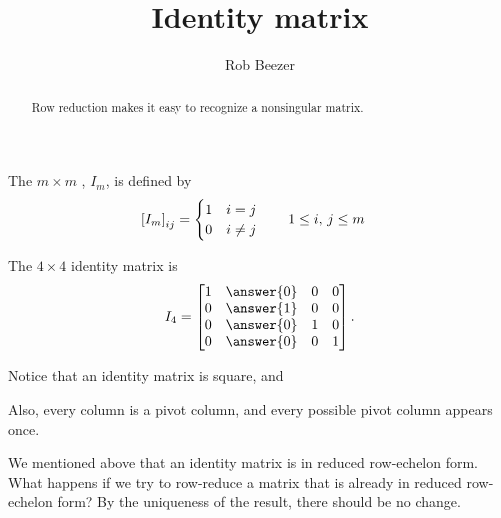 \documentclass{ximera}
\author{Rob Beezer}
\title{Identity matrix}
\begin{document}
\begin{abstract}
  Row reduction makes it easy to recognize a nonsingular matrix.
\end{abstract}
\maketitle

\begin{definition}
The $m\times m$ , $I_m$, is defined by
\begin{align*}
  \left\lbrack I_m\right\rbrack_{ij}&=
                         \begin{cases}
                           1 & i=j\\
                           0 & i\neq j
                         \end{cases}
                               \quad\quad
                               1\leq i,\,j\leq m
\end{align*}
\end{definition}

\begin{example}
  The $4\times 4$ identity matrix is
  \[
    I_4=
    \begin{bmatrix}
      1&\answer{0}&0&0\\
      0&\answer{1}&0&0\\
      0&\answer{0}&1&0\\
      0&\answer{0}&0&1
    \end{bmatrix}.
  \]
\end{example}

\begin{question}
  Notice that an identity matrix is square, and
  \begin{multipleChoice}
  \end{multipleChoice}
  
  \begin{feedback}[correct]
    Also, every column is a pivot column, and every possible pivot column
    appears once.

    We mentioned above that an identity matrix is in reduced row-echelon
    form.  What happens if we try to row-reduce a matrix that is already
    in reduced row-echelon form?  By the uniqueness of the result, there
    should be no change.
  \end{feedback}
\end{question}
\end{document}

